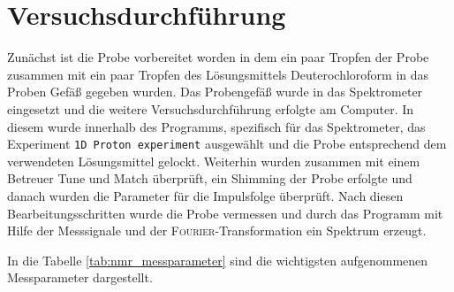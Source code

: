 \section{Versuchsdurchführung}
\label{sec:durchfuerung}
Zunächst ist die Probe vorbereitet worden in dem ein paar Tropfen der Probe zusammen mit ein paar Tropfen des Lösungsmittels Deuterochloroform in das Proben Gefäß gegeben wurden. Das Probengefäß wurde in das Spektrometer eingesetzt und die weitere Versuchsdurchführung erfolgte am Computer. In diesem wurde innerhalb des Programms, spezifisch für das Spektrometer, das Experiment \texttt{1D Proton experiment} ausgewählt und die Probe entsprechend dem verwendeten Lösungsmittel gelockt. Weiterhin wurden zusammen mit einem Betreuer Tune und Match überprüft, ein Shimming der Probe erfolgte und danach wurden die Parameter für die Impulsfolge überprüft. Nach diesen Bearbeitungsschritten wurde die Probe vermessen und durch das Programm mit Hilfe der Messsignale und der \textsc{Fourier}-Transformation ein Spektrum erzeugt. 

In die Tabelle \ref{tab:nmr_messparameter} sind die wichtigsten aufgenommenen Messparameter dargestellt.
\vspace*{-5mm}
\begin{table}[h!]
	\renewcommand*{\arraystretch}{1.2}
	\centering
	\caption{wichtigste Messparameter des NMR-Versuches}
	\label{tab:nmr_messparameter}
\end{table}%
\FloatBarrier